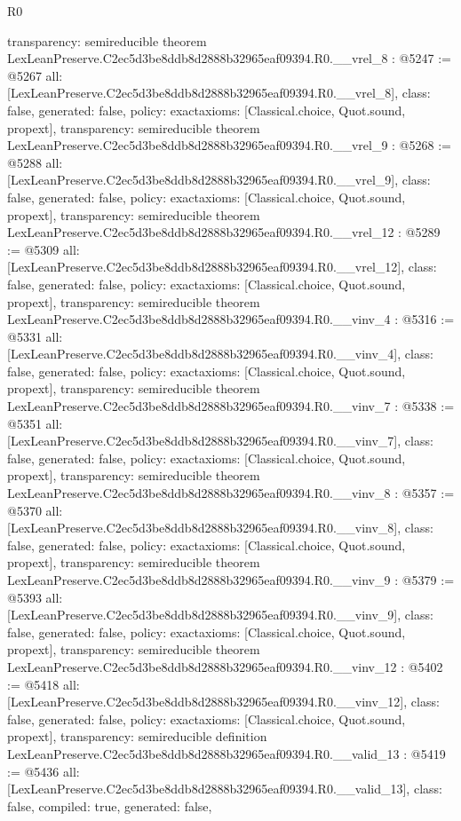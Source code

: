 \begin{lexlean}{R0}
\begin{coremodule}
{  transparency: semireducible
}
theorem LexLeanPreserve.C2ec5d3be8ddb8d2888b32965eaf09394.R0.__vrel_8 : @5247 := @5267 {
  all: [LexLeanPreserve.C2ec5d3be8ddb8d2888b32965eaf09394.R0.__vrel_8],
  class: false,
  generated: false,
  policy: exact{axioms: [Classical.choice, Quot.sound, propext]},
  transparency: semireducible
}
theorem LexLeanPreserve.C2ec5d3be8ddb8d2888b32965eaf09394.R0.__vrel_9 : @5268 := @5288 {
  all: [LexLeanPreserve.C2ec5d3be8ddb8d2888b32965eaf09394.R0.__vrel_9],
  class: false,
  generated: false,
  policy: exact{axioms: [Classical.choice, Quot.sound, propext]},
  transparency: semireducible
}
theorem LexLeanPreserve.C2ec5d3be8ddb8d2888b32965eaf09394.R0.__vrel_12 : @5289 := @5309 {
  all: [LexLeanPreserve.C2ec5d3be8ddb8d2888b32965eaf09394.R0.__vrel_12],
  class: false,
  generated: false,
  policy: exact{axioms: [Classical.choice, Quot.sound, propext]},
  transparency: semireducible
}
theorem LexLeanPreserve.C2ec5d3be8ddb8d2888b32965eaf09394.R0.__vinv_4 : @5316 := @5331 {
  all: [LexLeanPreserve.C2ec5d3be8ddb8d2888b32965eaf09394.R0.__vinv_4],
  class: false,
  generated: false,
  policy: exact{axioms: [Classical.choice, Quot.sound, propext]},
  transparency: semireducible
}
theorem LexLeanPreserve.C2ec5d3be8ddb8d2888b32965eaf09394.R0.__vinv_7 : @5338 := @5351 {
  all: [LexLeanPreserve.C2ec5d3be8ddb8d2888b32965eaf09394.R0.__vinv_7],
  class: false,
  generated: false,
  policy: exact{axioms: [Classical.choice, Quot.sound, propext]},
  transparency: semireducible
}
theorem LexLeanPreserve.C2ec5d3be8ddb8d2888b32965eaf09394.R0.__vinv_8 : @5357 := @5370 {
  all: [LexLeanPreserve.C2ec5d3be8ddb8d2888b32965eaf09394.R0.__vinv_8],
  class: false,
  generated: false,
  policy: exact{axioms: [Classical.choice, Quot.sound, propext]},
  transparency: semireducible
}
theorem LexLeanPreserve.C2ec5d3be8ddb8d2888b32965eaf09394.R0.__vinv_9 : @5379 := @5393 {
  all: [LexLeanPreserve.C2ec5d3be8ddb8d2888b32965eaf09394.R0.__vinv_9],
  class: false,
  generated: false,
  policy: exact{axioms: [Classical.choice, Quot.sound, propext]},
  transparency: semireducible
}
theorem LexLeanPreserve.C2ec5d3be8ddb8d2888b32965eaf09394.R0.__vinv_12 : @5402 := @5418 {
  all: [LexLeanPreserve.C2ec5d3be8ddb8d2888b32965eaf09394.R0.__vinv_12],
  class: false,
  generated: false,
  policy: exact{axioms: [Classical.choice, Quot.sound, propext]},
  transparency: semireducible
}
definition LexLeanPreserve.C2ec5d3be8ddb8d2888b32965eaf09394.R0.__valid_13 : @5419 := @5436 {
  all: [LexLeanPreserve.C2ec5d3be8ddb8d2888b32965eaf09394.R0.__valid_13],
  class: false,
  compiled: true,
  generated: false,
}
\end{coremodule}
\end{lexlean}
